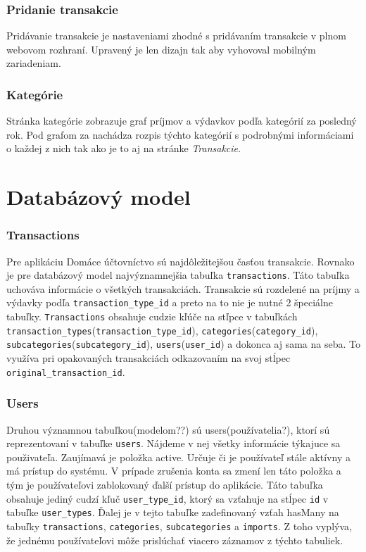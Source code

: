 \documentclass[12pt,oneside]{book}
\begin{document}
\subsubsection{Pridanie transakcie}
Pridávanie transakcie je nastaveniami zhodné s pridávaním transakcie v plnom webovom rozhraní. Upravený je len dizajn tak aby vyhovoval mobilným zariadeniam.
\subsubsection{Kategórie}
Stránka kategórie zobrazuje graf príjmov a výdavkov podľa kategórií za posledný rok. Pod grafom za nachádza rozpis týchto kategórií s podrobnými informáciami o každej z nich tak ako je to aj na stránke \emph{Transakcie}. 


\section{Databázový model}
\subsubsection{Transactions}
Pre aplikáciu Domáce účtovníctvo sú najdôležitejšou časťou transakcie. Rovnako je pre databázový model najvýznamnejšia tabuľka \texttt{transactions}. Táto tabuľka uchováva informácie o všetkých transakciách. Transakcie sú rozdelené na príjmy a výdavky podľa \texttt{transaction\_type\_id} a preto na to nie je nutné 2 špeciálne tabuľky. \texttt{Transactions} obsahuje cudzie kľúče na stľpce v tabuľkách \texttt{transaction\_types}(\texttt{transaction\_\allowbreak type\_\allowbreak id}), \texttt{categories}(\texttt{category\_id}), \texttt{subcategories}(\texttt{subcategory\_id}), \texttt{users}(\texttt{user\_id}) a dokonca aj sama na seba. To využíva pri opakovaných transakciách odkazovaním na svoj stĺpec \texttt{original\_transaction\_id}.
\subsubsection{Users}
Druhou významnou tabuľkou(modelom??) sú users(používatelia?), ktorí sú reprezentovaní v tabuľke \texttt{users}. Nájdeme v nej všetky informácie týkajuce sa použivateľa. Zaujímavá je položka active. Určuje či je používateľ stále aktívny a má prístup do systému. V prípade zrušenia konta sa zmení len táto položka a tým je používateľovi zablokovaný ďalší prístup do aplikácie. Táto tabuľka obsahuje jediný cudzí kľuč \texttt{user\_type\_id}, ktorý sa vzťahuje na stĺpec \texttt{id} v tabuľke \texttt{user\_types}. Ďalej je v tejto tabuľke zadefinovaný vzťah hasMany na tabuľky \texttt{transactions}, \texttt{categories}, \texttt{subcategories} a \texttt{imports}. Z toho vyplýva, že jednému používateľovi môže prislúchať viacero záznamov z týchto tabuliek.
\end{document}
